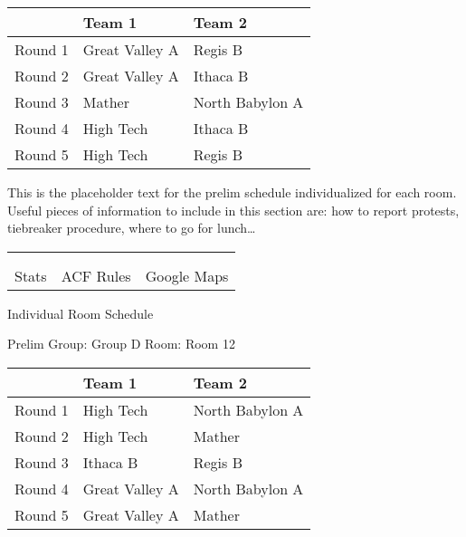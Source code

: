 \documentclass{article}%
\begin{document}
\begin{tabularx}{\textwidth}{|c|Y|Y|}%
\hline%
&Team 1&Team 2\\%
\hline%
Round 1&Great Valley A&Regis B\\%
Round 2&Great Valley A&Ithaca B\\%
Round 3&Mather&North Babylon A\\%
Round 4&High Tech&Ithaca B\\%
Round 5&High Tech&Regis B\\%
\hline%
\end{tabularx}%
\vspace*{16pt}%
\linebreak%
This is the placeholder text for the prelim schedule individualized for each room. Useful pieces of information to include in this section are: how to report protests, tiebreaker procedure, where to go for lunch…%
\vspace*{30pt}%
\newline%
%
\begin{tabularx}{\textwidth}{YYY}%
  &  &  \\%
\\%
Stats&ACF Rules&Google Maps\\%
\end{tabularx}%
\newpage%
\begin{center}%
\begin{Huge}%
Individual Room Schedule%
\end{Huge}%
\vspace*{16pt}%
\linebreak%
\begin{Large}%
Prelim Group: Group D \hfill Room: Room 12%
\end{Large}%
\end{center}%
%
\begin{tabularx}{\textwidth}{|c|Y|Y|}%
\hline%
&Team 1&Team 2\\%
\hline%
Round 1&High Tech&North Babylon A\\%
Round 2&High Tech&Mather\\%
Round 3&Ithaca B&Regis B\\%
Round 4&Great Valley A&North Babylon A\\%
Round 5&Great Valley A&Mather\\%
\hline%
\end{tabularx}%
\end{document}
